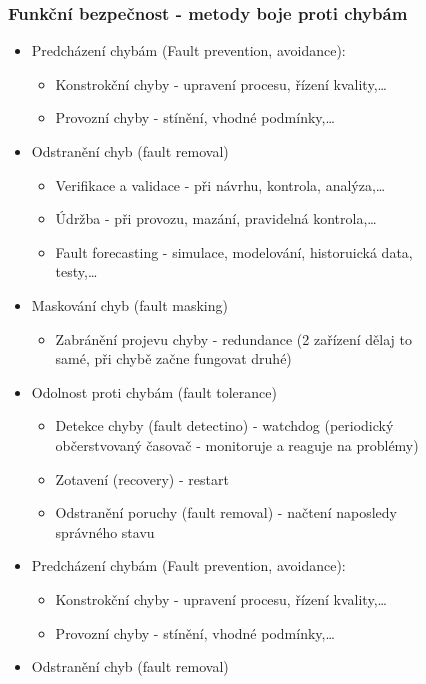 \begin{figure}[h]
\subsubsection*{Funkční bezpečnost - metody boje proti chybám}
\begin{itemize}
  \item Predcházení chybám (Fault prevention, avoidance): \begin{itemize}
    \item Konstrokční chyby - upravení procesu, řízení kvality,\dots
    \item Provozní chyby - stínění, vhodné podmínky,\dots
  \end{itemize}
  \item Odstranění chyb (fault removal) \begin{itemize}
    \item Verifikace a validace - při návrhu, kontrola, analýza,\dots
    \item Údržba - při provozu, mazání, pravidelná kontrola,\dots
    \item Fault forecasting - simulace, modelování, historuická data, testy,\dots
  \end{itemize}
  \item Maskování chyb (fault masking) \begin{itemize}
    \item Zabránění projevu chyby - redundance (2 zařízení dělaj to samé, při chybě začne fungovat druhé)
  \end{itemize}
  \item Odolnost proti chybám (fault tolerance) \begin{itemize}
    \item Detekce chyby (fault detectino) - watchdog (periodický občerstvovaný časovač - monitoruje a reaguje na problémy)
    \item Zotavení (recovery) - restart
    \item Odstranění poruchy (fault removal) - načtení naposledy správného stavu 
  \end{itemize}
    \item Predcházení chybám (Fault prevention, avoidance): \begin{itemize}
              \item Konstrokční chyby - upravení procesu, řízení kvality,\dots
              \item Provozní chyby - stínění, vhodné podmínky,\dots
          \end{itemize}
    \item Odstranění chyb (fault removal) \begin{itemize}

\end{itemize}
\end{itemize}
\end{figure}
